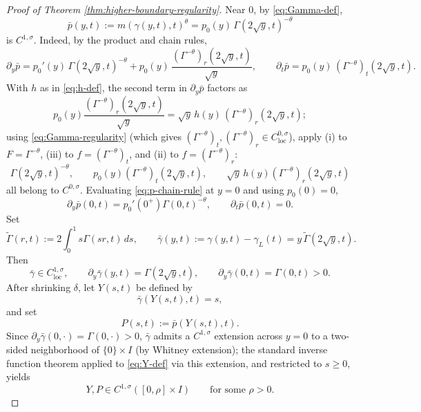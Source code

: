 \documentclass[11pt]{amsart}
\newcommand{\dd}{\,d}
\newcommand{\loc}{\mathrm{loc}}
\begin{document}
\begin{proof}[Proof of Theorem \ref{thm:higher-boundary-regularity}]
Near \(0\), by \eqref{eq:Gamma-def},
\[
        \bar{p}(y,t):=m(\gamma(y,t),t)^\theta
        =p_0(y)\,\Gamma(2\sqrt y,t)^{-\theta}
\]
is \(C^{1,\sigma}\). Indeed, by the product and chain rules,
\begin{equation}
\label{eq:p-chain-rule}
        \partial_y \bar{p}
        =p_0'(y)\,\Gamma(2\sqrt y,t)^{-\theta}
        +p_0(y)\,\frac{(\Gamma^{-\theta})_r(2\sqrt y,t)}{\sqrt y},
        \qquad
        \partial_t\bar{p}=p_0(y)\,(\Gamma^{-\theta})_t(2\sqrt y,t).
\end{equation}
With \(h\) as in \eqref{eq:h-def}, the second term in
\(\partial_y\bar{p}\) factors as
\[
        p_0(y)\frac{(\Gamma^{-\theta})_r(2\sqrt y,t)}{\sqrt y}
        =\sqrt y\,h(y)\,(\Gamma^{-\theta})_r(2\sqrt y,t);
\]
using \eqref{eq:Gamma-regularity} (which gives
\((\Gamma^{-\theta})_t,(\Gamma^{-\theta})_r\in C^{0,\sigma}_{\loc}\)),
apply (i) to \(F=\Gamma^{-\theta}\), (iii) to
\(f=(\Gamma^{-\theta})_t\), and (ii) to \(f=(\Gamma^{-\theta})_r\):
\[
        \Gamma(2\sqrt y,t)^{-\theta},\qquad
        p_0(y)(\Gamma^{-\theta})_t(2\sqrt y,t),\qquad
        \sqrt y\,h(y)(\Gamma^{-\theta})_r(2\sqrt y,t)
\]
all belong to \(C^{0,\sigma}\). Evaluating
\eqref{eq:p-chain-rule} at \(y=0\) and using \(p_0(0)=0\),
\[
        \partial_y \bar{p}(0,t)=p_0'(0^+)\Gamma(0,t)^{-\theta},
        \qquad
        \partial_t\bar{p}(0,t)=0 .
\]
Set
\[
        \widetilde\Gamma(r,t):=2\int_0^1 s\Gamma(sr,t)\dd s,\qquad
        \bar{\gamma}(y,t):=\gamma(y,t)-\gamma_L(t)=y\,\widetilde\Gamma(2\sqrt y,t).
\]
Then
\begin{equation}
\label{eq:gamma-regularity}
        \bar{\gamma}\in C^{1,\sigma}_{\loc},\qquad
        \partial_y \bar{\gamma}(y,t)=\Gamma(2\sqrt y,t),\qquad
        \partial_y \bar{\gamma}(0,t)=\Gamma(0,t)>0 .
\end{equation}
After shrinking \(\delta\), let \(Y(s,t)\) be defined by
\begin{equation}
\label{eq:Y-def}
        \bar{\gamma}(Y(s,t),t)=s,
\end{equation}
and set
\[
        P(s,t):=\bar{p}(Y(s,t),t).
\]
Since \(\partial_y \bar{\gamma}(0,\cdot)=\Gamma(0,\cdot)>0\), \(\bar{\gamma}\) admits a
\(C^{1,\sigma}\) extension across \(y=0\) to a two-sided neighborhood of
\(\{0\}\times I\) (by Whitney extension); the standard inverse function
theorem applied to \eqref{eq:Y-def} via this extension, and restricted to
\(s\ge0\), yields
\begin{equation}
\label{eq:YP-regularity}
        Y,P\in C^{1,\sigma}([0,\rho]\times I)\qquad\text{for some }\rho>0 .

\end{equation}
\end{proof}
\end{document}
